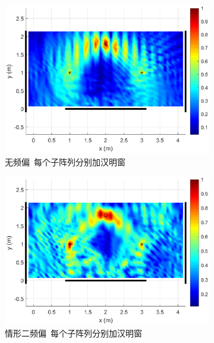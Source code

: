 \begin{figure}[htb]
  \centering
  \begin{subfigure}[t]{.45\linewidth}
    \centering
    \includegraphics[width=\textwidth]{figures/distribution/TPF/1.eps}
    \caption{无频偏~每个子阵列分别加汉明窗}
  \end{subfigure}
  \begin{subfigure}[t]{.45\linewidth}
    \centering
    \includegraphics[width=\textwidth]{figures/distribution/TPF/2.eps}
    \caption{情形二频偏~每个子阵列分别加汉明窗}
  \end{subfigure}
  \begin{subfigure}[t]{.45\linewidth}
    \centering

\end{subfigure}
\end{figure}
